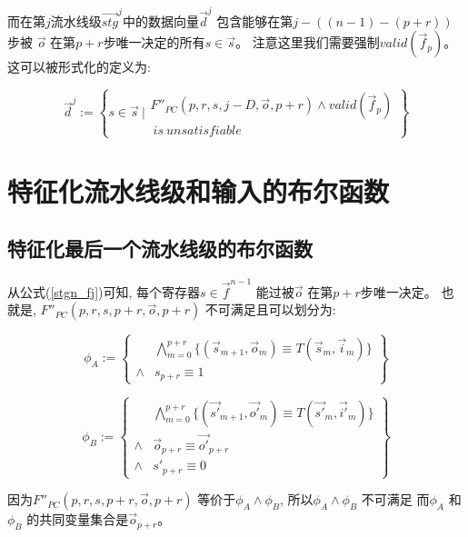 而在第$j$流水线级$\vec{stg}^j$中的数据向量$\vec{d}^j$
包含能够在第$j-((n-1)-(p+r))$步被
$\vec{o}$ 在第$p+r$步唯一决定的所有$s\in \vec{s}$。
注意这里我们需要强制$valid(\vec{f}_p)$。
这可以被形式化的定义为:

\begin{equation}\label{stgn_dj}
\vec{d}^{j} :=
 \left\{
 s\in \vec{s} ~|
 \begin{array}{cc}
 F''_{PC}(p,r,s,j-D,\vec{o},p+r)\wedge valid(\vec{f}_p)\\
 ~is~unsatisfiable
 \end{array}
\right\}
\end{equation}


\section{特征化流水线级和输入的布尔函数}\label{sec_char}
\subsection{特征化最后一个流水线级的布尔函数}

从公式(\ref{stgn_fj})可知,
每个寄存器$s\in \vec{f}^{n-1}$ 能过被$\vec{o}$ 在第$p+r$步唯一决定。
也就是,
$F''_{PC}(p,r,s,p+r,\vec{o},p+r)$ 不可满足且可以划分为:

\begin{equation}
 \phi_A :=
 \left\{
\begin{array}{cc}
&\bigwedge_{m=0}^{p+r}
\{
(\vec{s}_{m+1},\vec{o}_m)\equiv T(\vec{s}_m,\vec{i}_m)
\}
\\
\wedge& s_{p+r}\equiv 1
\end{array}
\right\}
\end{equation}

\begin{equation}
\phi_B :=
\left\{
\begin{array}{cc}
&\bigwedge_{m=0}^{p+r}
\{
(\vec{s'}_{m+1},\vec{o'}_m)\equiv T(\vec{s'}_m,\vec{i'}_m)
\}
\\
\wedge&\vec{o}_{p+r}\equiv \vec{o'}_{p+r} \\
\wedge& s'_{p+r}\equiv 0
\end{array}
\right\}
\end{equation}

因为$F''_{PC}(p,r,s,p+r,\vec{o},p+r)$ 等价于$\phi_A \wedge \phi_B$,
所以$\phi_A \wedge \phi_B$ 不可满足
而$\phi_A$ 和$\phi_B$ 的共同变量集合是$\vec{o}_{p+r}$。

